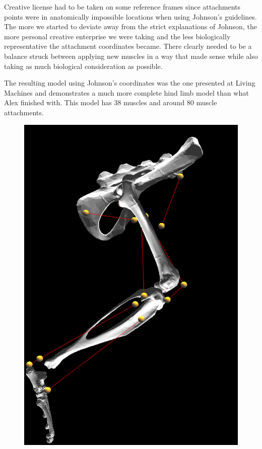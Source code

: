 \documentclass[runningheads,a4paper]{llncs}
\begin{document}
	Creative license had to be taken on some reference frames since attachments points were in anatomically impossible locations when using Johnson’s guidelines. The more we started to deviate away from the strict explanations of Johnson, the more personal creative enterprise we were taking and the less biologically representative the attachment coordinates became. There clearly needed to be a balance struck between applying new muscles in a way that made sense while also taking as much biological consideration as possible. \par
	The resulting model using Johnson’s coordinates was the one presented at Living Machines and demonstrates a much more complete hind limb model than what Alex finished with. This model has 38 muscles and around 80 muscle attachments. \par
			\begin{figure}
				\centering
				\begin{minipage}{0.5\textwidth}
					\centering
					\includegraphics[width=\textwidth]{att2.PNG}

\end{minipage}
\end{figure}
\end{document}
